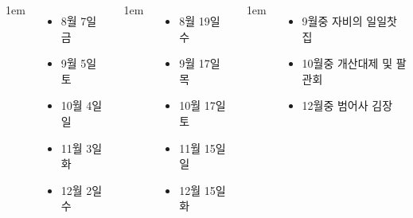 \documentclass[	17pt, 
							a2paper, 
							portrait, %
							margin=0mm, %
							innermargin=10mm,  		%
							blockverticalspace=4mm, %
							colspace=5mm, 
							subcolspace=0mm
							]{tikzposter}
\begin{document}
\begin{columns}
			{
					\setlength{\leftmargini}{4em}
					\setlength{\labelsep} {1em}
					\begin{itemize}
					\item  8월 7일 금
					\item  9월 5일 토
					\item 10월 4일 일
					\item 11월 3일 화
					\item 12월 2일 수
					\end{itemize}
			} %


			{
					\setlength{\leftmargini}{4em}
					\setlength{\labelsep} {1em}
					\begin{itemize}
					\item  8월 19일 수
					\item  9월 17일 목
					\item 10월 17일 토
					\item 11월 15일 일
					\item 12월 15일 화
					\end{itemize}
			} %


			{
					\setlength{\leftmargini}{4em}
					\setlength{\labelsep} {1em}
					\begin{itemize}
					\item  9월중 자비의 일일찻집
					\item 10월중 개산대제 및 팔관회
					\item 12월중 범어사 김장
					\end{itemize}
			} %

	\end{columns}
\end{document}
